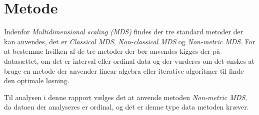 \section*{Metode}
\label{Metode}
%
Indenfor \textit{Multidimensional scaling (MDS)} findes der tre standard metoder der kan anvendes, det er \textit{Classical MDS}, \textit{Non-classical MDS} og \textit{Non-metric MDS}. For at bestemme hvilken af de tre metoder der bør anvendes kigges der på datasættet, om det er interval eller ordinal data og der vurderes om det ønskes at bruge en metode der anvender linear algebra eller iterative algoritmer til finde den optimale løsning. 

\noindent Til analysen i denne rapport vælges det at anvende metoden \textit{Non-metric MDS}, da dataen der analyseres er ordinal, og det er denne type data metoden kræver. 
